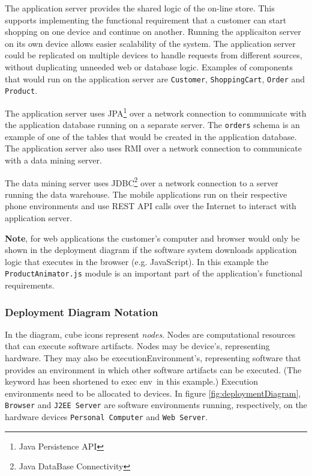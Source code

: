 The application server provides the shared logic of the on-line store.
This supports implementing the functional requirement that a customer can start shopping on one device and continue on another.
Running the applicaiton server on its own device allows easier scalability of the system.
The application server could be replicated on multiple devices to handle requests from different sources, without duplicating unneeded web or database logic.
Examples of components that would run on the application server are \texttt{Customer}, \texttt{ShoppingCart}, \texttt{Order} and \texttt{Product}.

The application server uses JPA\footnote{Java Persistence API} over a network connection to communicate with the application data\-base running on a separate server.
The \texttt{orders} schema is an example of one of the tables that would be created in the application database.
The application server also uses RMI over a network connection to communicate with a data mining server.

The data mining server uses JDBC\footnote{Java DataBase Connectivity} over a network connection to a server running the data warehouse.
The mobile applications run on their respective phone environments and use REST API calls over the Internet to interact with application server.

\textbf{Note}, for web applications the customer's computer and browser would only be shown in the deployment diagram
if the software system downloads application logic that executes in the browser (e.g. JavaScript).
In this example the \texttt{ProductAnimator.js} module is an important part of the application's functional requirements.

\subsubsection{Deployment Diagram Notation}\label{sec:deploymentNotation}
In the diagram, cube icons represent \emph{nodes}. Nodes are computational resources that can execute software artifacts.
Nodes may be \guillemotleft device\guillemotright's, representing hardware.
They may also be \guillemotleft executionEnvironment\guillemotright's, representing software that provides an environment in which other software artifacts can be executed.
(The keyword has been shortened to \guillemotleft exec env\guillemotright~in this example.)
Execution environments need to be allocated to devices.
In figure \ref{fig:deploymentDiagram}, \texttt{Browser} and \texttt{J2EE Server} are software environments running,
respectively, on the hardware devices \texttt{Personal Computer} and \texttt{Web Server}.

